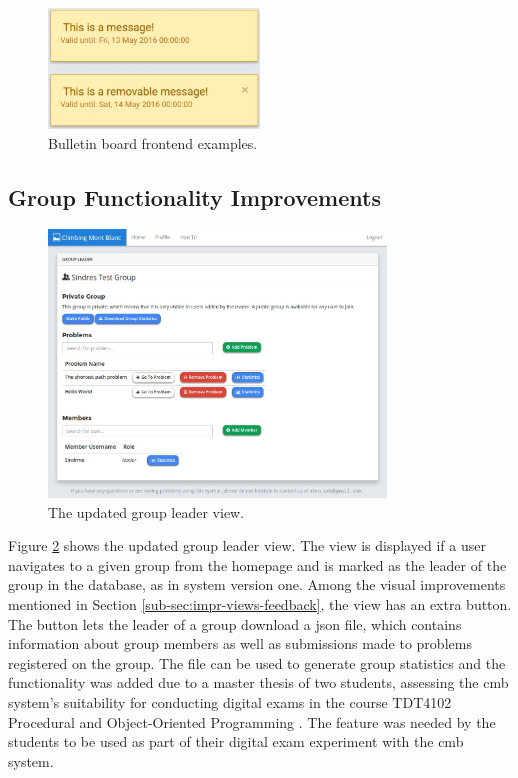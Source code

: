 \begin{figure}[t!]
    \centering
    \includegraphics[width=0.5\textwidth]{figs/bulletin_view.jpg}
    \caption[Bulletin board frontend examples]{Bulletin board frontend examples.}
    \label{fig:bulletin-view}
\end{figure}

\subsection{Group Functionality Improvements}
\begin{figure}[h!]
    \centering
    \includegraphics[width=0.8\textwidth]{figs/new_leader.jpg}
    \caption[The updated group leader view]{The updated group leader view.}
    \label{fig:new-leader}
\end{figure}
Figure \ref{fig:new-leader} shows the updated group leader view. The view is displayed if a user navigates to a given group from the homepage and is marked as the leader of the group in the database, as in system version one. Among the visual improvements mentioned in Section \ref{sub-sec:impr-views-feedback}, the view has an extra button. The button lets the leader of a group download a \gls{json} file, which contains information about group members as well as submissions made to problems registered on the group. The file can be used to generate group statistics and the functionality was added due to a master thesis of two students, assessing the \gls{cmb} system's suitability for conducting digital exams in the course TDT4102 Procedural and Object-Oriented Programming \cite{TDT4102}. The feature was needed by the students to be used as part of their digital exam experiment with the \gls{cmb} system. \\


